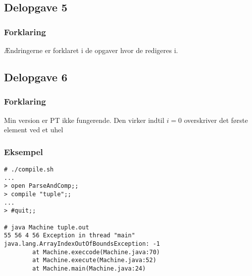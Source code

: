 \subsection{Delopgave 5}\label{ass:3-5}
\subsubsection{Forklaring}
Ændringerne er forklaret i de opgaver hvor de redigeres i.

\subsection{Delopgave 6}\label{ass:3-6}
\subsubsection{Forklaring}
Min version er PT ikke fungerende. Den virker indtil $i=0$ overskriver det første element ved et uhel

\subsubsection{Eksempel}
\begin{lstlisting}
# ./compile.sh
...
> open ParseAndComp;;
> compile "tuple";;
...
> #quit;;

# java Machine tuple.out
55 56 4 56 Exception in thread "main" java.lang.ArrayIndexOutOfBoundsException: -1
        at Machine.execcode(Machine.java:70)
        at Machine.execute(Machine.java:52)
        at Machine.main(Machine.java:24)
\end{lstlisting}

